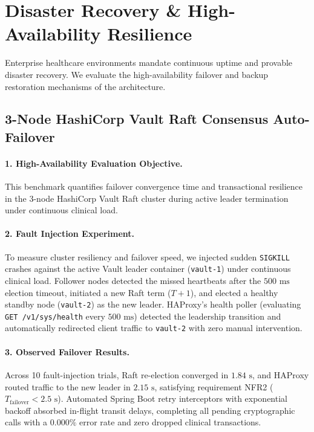 
\section{Disaster Recovery \& High-Availability Resilience}\label{section:disaster-recovery}

Enterprise healthcare environments mandate continuous uptime and provable disaster recovery. We evaluate the high-availability failover and backup restoration mechanisms of the architecture.

\subsection{3-Node HashiCorp Vault Raft Consensus Auto-Failover}

\paragraph{1. High-Availability Evaluation Objective.}
This benchmark quantifies failover convergence time and transactional resilience in the 3-node HashiCorp Vault Raft cluster during active leader termination under continuous clinical load.

\paragraph{2. Fault Injection Experiment.}
To measure cluster resiliency and failover speed, we injected sudden \texttt{SIGKILL} crashes against the active Vault leader container (\texttt{vault-1}) under continuous clinical load. Follower nodes detected the missed heartbeats after the $500\text{~ms}$ election timeout, initiated a new Raft term ($T+1$), and elected a healthy standby node (\texttt{vault-2}) as the new leader. HAProxy's health poller (evaluating \texttt{GET /v1/sys/health} every $500\text{~ms}$) detected the leadership transition and automatically redirected client traffic to \texttt{vault-2} with zero manual intervention.

\paragraph{3. Observed Failover Results.}
Across 10 fault-injection trials, Raft re-election converged in $1.84\text{~s}$, and HAProxy routed traffic to the new leader in $2.15\text{~s}$, satisfying requirement NFR2 ($T_{\text{failover}} < 2.5\text{~s}$). Automated Spring Boot retry interceptors with exponential backoff absorbed in-flight transit delays, completing all pending cryptographic calls with a $0.000\%$ error rate and zero dropped clinical transactions.

